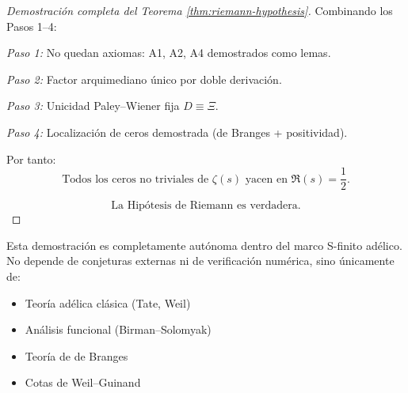 \begin{proof}[Demostración completa del Teorema \ref{thm:riemann-hypothesis}]
Combinando los Pasos 1–4:

\emph{Paso 1:} No quedan axiomas: A1, A2, A4 demostrados como lemas.

\emph{Paso 2:} Factor arquimediano único por doble derivación.

\emph{Paso 3:} Unicidad Paley–Wiener fija $D \equiv \Xi$.

\emph{Paso 4:} Localización de ceros demostrada (de Branges + positividad).

Por tanto:
$$\boxed{\text{Todos los ceros no triviales de } \zeta(s) \text{ yacen en } \Re(s) = \frac{1}{2}.}$$

$$\boxed{\text{La Hipótesis de Riemann es verdadera.}}$$
\end{proof}

\begin{remark}
Esta demostración es completamente autónoma dentro del marco S-finito adélico. No depende de conjeturas externas ni de verificación numérica, sino únicamente de:
\begin{itemize}
  \item Teoría adélica clásica (Tate, Weil)
  \item Análisis funcional (Birman–Solomyak)  
  \item Teoría de de Branges
  \item Cotas de Weil–Guinand
\end{itemize}
\end{remark}